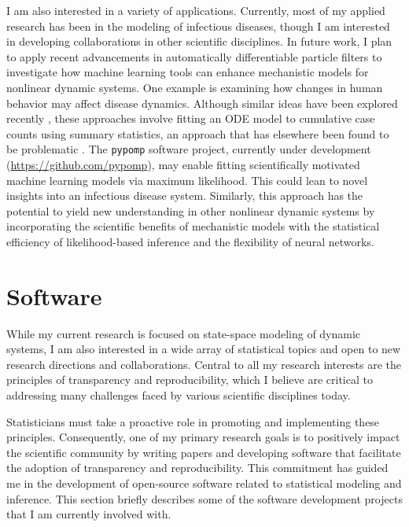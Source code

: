 \documentclass{article}
\begin{document}
I am also interested in a variety of applications.
Currently, most of my applied research has been in the modeling of infectious diseases, though I am interested in developing collaborations in other scientific disciplines.
In future work, I plan to apply recent advancements in automatically differentiable particle filters \cite{tan24} to investigate how machine learning tools can enhance mechanistic models for nonlinear dynamic systems.
One example is examining how changes in human behavior may affect disease dynamics.
Although similar ideas have been explored recently \cite{dandekar20,kim21}, these approaches involve fitting an ODE model to cumulative case counts using summary statistics, an approach that has elsewhere been found to be problematic \cite{king15}.
The \texttt{pypomp} software project, currently under development (\url{https://github.com/pypomp}), may enable fitting scientifically motivated machine learning models via maximum likelihood.
This could lean to novel insights into an infectious disease system.
Similarly, this approach has the potential to yield new understanding in other nonlinear dynamic systems by incorporating the scientific benefits of mechanistic models \cite{baker18} with the statistical efficiency of likelihood-based inference and the flexibility of neural networks.

\section{Software}\label{sec:software}

While my current research is focused on state-space modeling of dynamic systems, I am also interested in a wide array of statistical topics and open to new research directions and collaborations.
Central to all my research interests are the principles of transparency and reproducibility, which I believe are critical to addressing many challenges faced by various scientific disciplines today.

Statisticians must take a proactive role in promoting and implementing these principles.
Consequently, one of my primary research goals is to positively impact the scientific community by writing papers and developing software that facilitate the adoption of transparency and reproducibility.
This commitment has guided me in the development of open-source software related to statistical modeling and inference.
This section briefly describes some of the software development projects that I am currently involved with.
\end{document}
